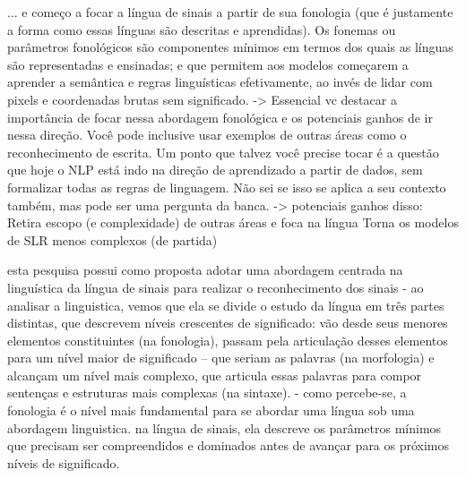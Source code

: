         
    ... e começo a focar a língua de sinais a partir de sua fonologia (que é justamente a forma como essas línguas são descritas e aprendidas). Os fonemas ou parâmetros fonológicos são componentes mínimos em termos dos quais as línguas são representadas e ensinadas; e que permitem aos modelos começarem a aprender a semântica e regras linguísticas efetivamente, ao invés de lidar com pixels e coordenadas brutas sem significado. 
        -> Essencial vc destacar a importância de focar nessa abordagem fonológica e os potenciais ganhos de ir nessa direção. Você pode inclusive usar exemplos de outras áreas como o reconhecimento de escrita. Um ponto que talvez você precise tocar é a questão que hoje o NLP está indo na direção de aprendizado a partir de dados, sem formalizar todas as regras de linguagem. Não sei se isso se aplica a seu contexto também, mas pode ser uma pergunta da banca.
            -> potenciais ganhos disso:
                Retira escopo (e complexidade) de outras áreas e foca na língua
                Torna os modelos de SLR menos complexos (de partida)
                


















esta pesquisa possui como proposta adotar uma abordagem centrada na linguística da língua de sinais para realizar o reconhecimento dos sinais
- ao analisar a linguistica, vemos que ela se divide o estudo da língua em três partes distintas, que descrevem níveis crescentes de significado: vão desde seus menores elementos constituintes (na fonologia), passam pela articulação desses elementos para um nível maior de significado -- que seriam as palavras (na morfologia) e alcançam um nível mais complexo, que articula essas palavras para compor sentenças e estruturas mais complexas (na sintaxe).
- como percebe-se, a fonologia é o nível mais fundamental para se abordar uma língua sob uma abordagem linguistica. na língua de sinais, ela descreve os parâmetros mínimos que precisam ser compreendidos e dominados antes de avançar para os próximos níveis de significado. 


